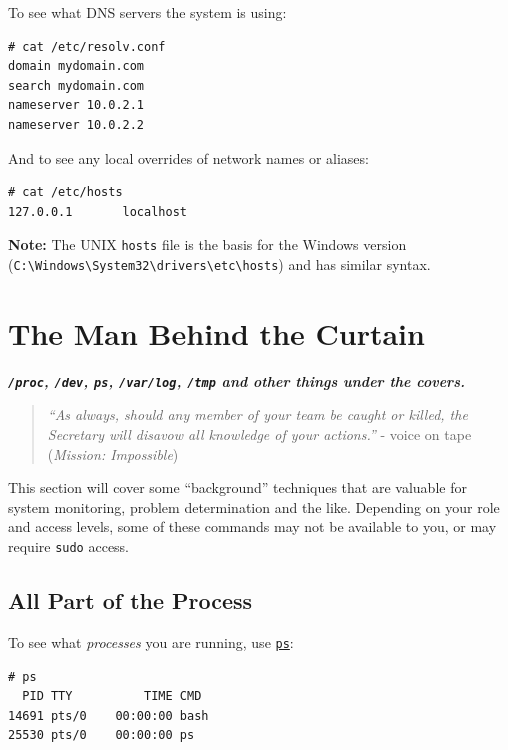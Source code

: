 \documentclass[10pt,]{book}
\numberwithin{figure}{chapter}
\begin{document}
To see what DNS servers the system is using:

\begin{verbatim}
# cat /etc/resolv.conf
domain mydomain.com
search mydomain.com
nameserver 10.0.2.1
nameserver 10.0.2.2
\end{verbatim}

And to see any local overrides of network names or aliases:

\begin{verbatim}
# cat /etc/hosts
127.0.0.1       localhost
\end{verbatim}

\textbf{Note:} The UNIX \texttt{hosts} file is the basis for the Windows
version
(\texttt{C:\textbackslash{}Windows\textbackslash{}System32\textbackslash{}drivers\textbackslash{}etc\textbackslash{}hosts})
and has similar syntax.

\chapter{The Man Behind the Curtain}\label{the-man-behind-the-curtain}

\textbf{\emph{\texttt{/proc}, \texttt{/dev}, \texttt{ps},
\texttt{/var/log}, \texttt{/tmp} and other things under the covers.}}

\begin{quote}
\emph{``As always, should any member of your team be caught or killed,
the Secretary will disavow all knowledge of your actions.''} - voice on
tape (\emph{Mission: Impossible})
\end{quote}

This section will cover some ``background'' techniques that are valuable
for system monitoring, problem determination and the like. Depending on
your role and access levels, some of these commands may not be available
to you, or may require \texttt{sudo} access.

\section{All Part of the Process}\label{all-part-of-the-process}

To see what \emph{processes} you are running, use
\href{http://linux.die.net/man/1/ps}{\texttt{ps}}:

\begin{verbatim}
# ps
  PID TTY          TIME CMD
14691 pts/0    00:00:00 bash
25530 pts/0    00:00:00 ps
\end{verbatim}
\end{document}
